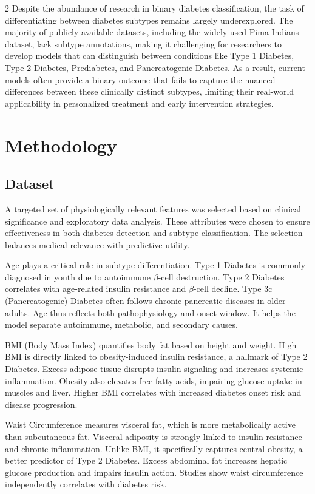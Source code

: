 \documentclass{article}
\begin{document}
\begin{multicols}{2}
Despite the abundance of research in binary diabetes classification, the task of differentiating between diabetes subtypes remains largely underexplored. The majority of publicly available datasets, including the widely-used Pima Indians dataset, lack subtype annotations, making it challenging for researchers to develop models that can distinguish between conditions like Type 1 Diabetes, Type 2 Diabetes, Prediabetes, and Pancreatogenic Diabetes. As a result, current models often provide a binary outcome that fails to capture the nuanced differences between these clinically distinct subtypes, limiting their real-world applicability in personalized treatment and early intervention strategies.


\section{Methodology}
\subsection{Dataset}
A targeted set of physiologically relevant features was selected based on clinical significance and exploratory data analysis. These attributes were chosen to ensure effectiveness in both diabetes detection and subtype classification. The selection balances medical relevance with predictive utility.

Age plays a critical role in subtype differentiation.
Type 1 Diabetes is commonly diagnosed in youth due to autoimmune $\beta$-cell destruction.
Type 2 Diabetes correlates with age-related insulin resistance and $\beta$-cell decline.
Type 3c (Pancreatogenic) Diabetes often follows chronic pancreatic diseases in older adults.
Age thus reflects both pathophysiology and onset window.
It helps the model separate autoimmune, metabolic, and secondary causes.

BMI (Body Mass Index) quantifies body fat based on height and weight.
High BMI is directly linked to obesity-induced insulin resistance, a hallmark of Type 2 Diabetes.
Excess adipose tissue disrupts insulin signaling and increases systemic inflammation.
Obesity also elevates free fatty acids, impairing glucose uptake in muscles and liver.
Higher BMI correlates with increased diabetes onset risk and disease progression.

Waist Circumference measures visceral fat, which is more metabolically active than subcutaneous fat.
Visceral adiposity is strongly linked to insulin resistance and chronic inflammation.
Unlike BMI, it specifically captures central obesity, a better predictor of Type 2 Diabetes.
Excess abdominal fat increases hepatic glucose production and impairs insulin action.
Studies show waist circumference independently correlates with diabetes risk.


\end{multicols}
\end{document}
